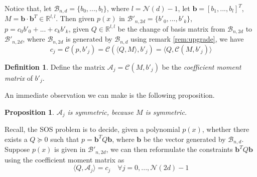 \documentclass[12pt]{amsart}
\numberwithin{equation}{section}
\newtheorem{prop}[thm]{Proposition}
\theoremstyle{definition}
\newtheorem{definition}[thm]{Definition}
\numberwithin{thm}{section}
\begin{document}
\smallskip
Notice that, let $\mathcal{B}_{n, d} = \{b_0,...,b_l\}$, where $l = \mathcal{N}(d) - 1$, 
let $\mathbf{b} = [b_1, ..., b_l]^T$, $M = \mathbf{b} \cdot \mathbf{b}^T \in \mathbb{R}^{l, l}$. 
Then given $p(x)$ in $\mathcal{B}'_{n, 2d} = \{b'_0, ..., b'_k\}$, $p = c_0b'_0 + ... + c_k b'_k$, 
given $Q \in \mathbb{R}^{l, l}$ be the change of basis matrix from $\mathcal{B}_{n, 2d}$ to $\mathcal{B}'_{n, 2d}$, 
where $\mathcal{B}_{n, 2d}$ is generated by $\mathcal{B}_{n, d}$ using remark \ref{rem:upgrade}, we have
\begin{equation}
     c_j = \mathcal{C}(p, b'_j) = \mathcal{C}(\langle Q, M \rangle, b'_j ) = \langle Q, \mathcal{C}(M, b'_j) \rangle
\end{equation}

\begin{definition}
Define the matrix $\mathcal{A}_j = \mathcal{C}(M, b'_j)$ be the \emph{coefficient moment matrix} of $b'_j$.
\end{definition}

An immediate observation we can make is the following proposition.
\begin{prop}
     $\mathcal{A}_j$ is symmetric, because $M$ is symmetric.
\end{prop}

\smallskip
Recall, the SOS problem is to decide, given a polynomial $p(x)$, 
whether there exists a $Q \succcurlyeq 0$ such that $p = \mathbf{b}^TQ \mathbf{b}$, where $\mathbf{b}$ be the vector generated by $\mathcal{B}_{n, d}$.
Suppose $p(x)$ is given in $\mathcal{B'}_{n, 2d}$, we can then reformulate the constraints $\mathbf{b}^TQ \mathbf{b}$ using the {coefficient moment matrix} as
\begin{equation}
     \langle Q, \mathcal{A}_j \rangle = c_j \quad \forall j = 0,..., \mathcal{N}(2d)- 1
\end{equation} 
\end{document}
